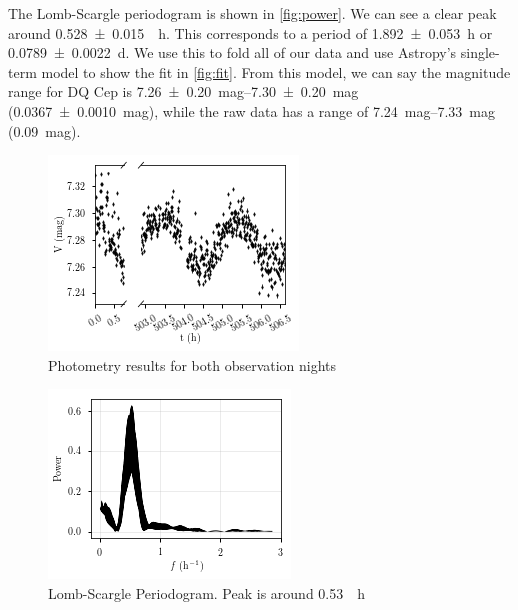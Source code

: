 \documentclass[%
aip,
jmp,
reprint,
floatfix,
nofootinbib
]{revtex4-1}
\begin{document}
	The Lomb-Scargle periodogram is shown in \autoref{fig:power}. We can see a clear peak around \SI{0.528\pm .015}{\per \hour}. This corresponds to a period of \SI{1.892\pm.053}{\hour} or \SI{0.0789\pm.0022}{\day}. We use this to fold all of our data and use Astropy's single-term model to show the fit in \autoref{fig:fit}. From this model, we can say the magnitude range for DQ Cep is \SIrange{7.26\pm.20}{7.30\pm.20}{mag} (\SI{.0367\pm.0010}{mag}), while the raw data has a range of \SIrange{7.24}{7.33}{mag} (\SI{.09}{mag}).
	 \begin{figure}[t]
	 	\centering
	 	\includegraphics[width=\linewidth]{figs/rawmags.pdf}
	 	\caption{Photometry results for both observation nights}
	 	\label{fig:raw}
	 \end{figure}
	 \begin{figure}[t]
	 	\centering
	 	\includegraphics[width=\linewidth]{figs/power.pdf}
	 	\caption{Lomb-Scargle Periodogram. Peak is around \SI{0.53}{\per \hour}}
	 	\label{fig:power}
	 \end{figure}
\end{document}
